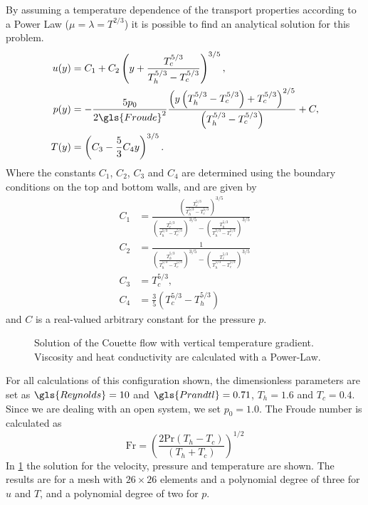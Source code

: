 By assuming a temperature dependence of the transport properties according to a Power Law ($\mu = \lambda = T^{2/3}$) it is possible to find an analytical solution for this problem.
\begin{subequations}
	\begin{align}
		u(y) & = C_1 + C_2\left(y + \frac{T_c^{5/3}}{T_h^{5/3}-T_c^{5/3}} \right)^{3/5},\label{eq:CouetteU}                                                                \\
		p(y) & = -\frac{5p_0}{2\gls{Froude}^2}\frac{\left(y\left(T_h^{5/3}-T_c^{5/3}\right)+T_c^{5/3}\right)^{2/5}}{\left(T_h^{5/3}-T_c^{5/3}\right)}+C,\label{eq:Couettep} \\
		T(y) & = \left(C_3 - \frac{5}{3}C_4 y\right)^{3/5}\label{eq:CouetteT}.
	\end{align}
\end{subequations}
Where the constants $C_1$, $C_2$, $C_3$ and $C_4$ are determined using the boundary conditions on the top and bottom walls, and are given by
\begin{align}
	C_1 & = \frac{\left(\frac{T_c^{5/3}}{T_h^{5/3}-T_c^{5/3}}\right)^{3/5}}{\left(\frac{T_c^{5/3}}{T_h^{5/3}-T_c^{5/3}}\right)^{3/5}-\left(\frac{T_h^{5/3}}{T_h^{5/3}-T_c^{5/3}}\right)^{3/5}} \\
	C_2 & = \frac{1}{\left(\frac{T_h^{5/3}}{T_h^{5/3}-T_c^{5/3}}\right)^{3/5}-\left(\frac{T_c^{5/3}}{T_h^{5/3}-T_c^{5/3}}\right)^{3/5}}                                                        \\
	C_3 & = T_c^{5/3},                                                                                                                                                                         \\
	C_4 & = \frac{3}{5}\left(T_c^{5/3}-T_h^{5/3}\right)
\end{align}
and $C$ is a real-valued arbitrary constant for the pressure $p$.%
\begin{center}
	\begin{figure}[tb]
		\pgfplotsset{
			group/xticklabels at=edge bottom,
		}
		\caption{Solution of the Couette flow with vertical temperature gradient. Viscosity and heat conductivity are calculated with a Power-Law.}
		\label{fig:CouetteSolution}
	\end{figure}
\end{center}
\FloatBarrier
For all calculations of this configuration shown, the dimensionless parameters are set as $\gls{Reynolds} = 10$ and $\gls{Prandtl} =0.71$, $T_h = 1.6$ and $T_c = 0.4$. Since we are dealing with an open system, we set $p_0 =1.0$. The Froude number is calculated as
\begin{equation}
	\text{Fr} = \left( \frac{2\text{Pr}(T_h-T_c)}{(T_h+T_c)}\right)^{1/2}
\end{equation}
In \cref{fig:CouetteSolution} the solution for the velocity, pressure and temperature are shown. The results are for a mesh with $26\times26$ elements and a polynomial degree of three for $u$ and $T$, and a polynomial degree of two for $p$.
